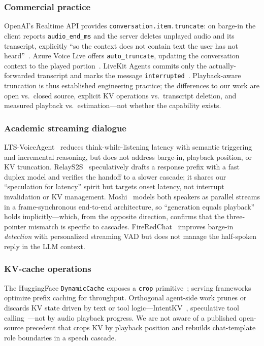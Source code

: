 \documentclass[conference]{IEEEtran}
\begin{document}
\subsubsection{Commercial practice} OpenAI's Realtime API provides \texttt{conversation.item.truncate}: on barge-in the client reports \texttt{audio\_end\_ms} and the server deletes unplayed audio and its transcript, explicitly ``so the context does not contain text the user has not heard''~\cite{openai_realtime}. Azure Voice Live offers \texttt{auto\_truncate}, updating the conversation context to the played portion~\cite{azure_voicelive}. LiveKit Agents commits only the actually-forwarded transcript and marks the message \texttt{interrupted}~\cite{livekit_agents}. Playback-aware truncation is thus established engineering practice; the differences to our work are open vs.\ closed source, explicit KV operations vs.\ transcript deletion, and measured playback vs.\ estimation---not whether the capability exists.

\subsubsection{Academic streaming dialogue} LTS-VoiceAgent~\cite{lts_voiceagent} reduces think-while-listening latency with semantic triggering and incremental reasoning, but does not address barge-in, playback position, or KV truncation. RelayS2S~\cite{relays2s} speculatively drafts a response prefix with a fast duplex model and verifies the handoff to a slower cascade; it shares our ``speculation for latency'' spirit but targets onset latency, not interrupt invalidation or KV management. Moshi~\cite{moshi} models both speakers as parallel streams in a frame-synchronous end-to-end architecture, so ``generation equals playback'' holds implicitly---which, from the opposite direction, confirms that the three-pointer mismatch is specific to cascades. FireRedChat~\cite{fireredchat} improves barge-in \emph{detection} with personalized streaming VAD but does not manage the half-spoken reply in the LLM context.

\subsubsection{KV-cache operations} The HuggingFace \texttt{DynamicCache} exposes a \texttt{crop} primitive~\cite{hf_kvcache}; serving frameworks optimize prefix caching for throughput. Orthogonal agent-side work prunes or discards KV state driven by text or tool logic---IntentKV~\cite{intentkv}, speculative tool calling~\cite{sia}---not by audio playback progress. We are not aware of a published open-source precedent that crops KV by playback position and rebuilds chat-template role boundaries in a speech cascade.
\end{document}
